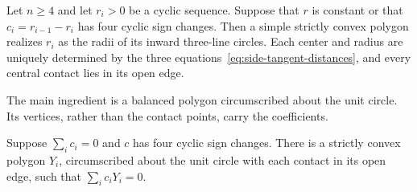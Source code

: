 \begin{theorem}\label{thm:side-tangent-converse}
Let $n\ge4$ and let $r_i>0$ be a cyclic sequence. Suppose that $r$ is
constant or that $c_i=r_{i-1}-r_i$ has four cyclic sign changes. Then a
simple strictly convex polygon realizes $r_i$ as the radii of its inward
three-line circles. Each center and radius are uniquely determined by the
three equations~\eqref{eq:side-tangent-distances}, and every central contact
lies in its open edge.
\end{theorem}

The main ingredient is a balanced polygon circumscribed about the unit
circle. Its vertices, rather than the contact points, carry the coefficients.

\begin{lemma}\label{lem:side-tangent-balance}
Suppose $\sum_i c_i=0$ and $c$ has four cyclic sign changes. There is a
strictly convex polygon $Y_i$, circumscribed about the unit circle with each
contact in its open edge, such that $\sum_i c_iY_i=0$.
\end{lemma}

